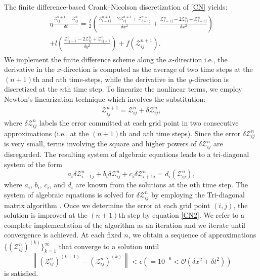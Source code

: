 \documentclass{article}
\begin{document}
The finite difference-based Crank--Nicolson discretization of \eqref{CN} yields:
\begin{eqnarray}
\begin{aligned}
\eta \frac{\mathcal{Z}^{n+1}_{ij}-\mathcal{Z}^n_{ij}}{\delta t}=\frac{l}{2}\left(\frac{\mathcal{Z}^{n+1}_{i-1j} - 2\mathcal{Z}^{n+1}_{ij} + \mathcal{Z}^{n+1}_{i+1j}}{\delta x^2} + \frac{\mathcal{Z}^{n}_{i-1j} - 2\mathcal{Z}^{n}_{ij} + \mathcal{Z}^{n}_{i+1j}}{\delta x^2}\right )\\
+l\left(\frac{\mathcal{Z}^{n}_{ij-1} - 2 \mathcal{Z}^{n}_{ij} + \mathcal{Z}^{n}_{ij+1}}{\delta y^2}\right)+f(\mathcal{Z}^{n+1}_{ij}).\label{CN1}
\end{aligned}
\end{eqnarray}
We implement the finite difference scheme along the $x$-direction i.e., the derivative in the $x$-direction is computed as the average of two time steps at the $\left(n+1\right)$th and $n$th time-steps, while the derivative in the $y$-direction is discretized at the $n$th time step. To linearize the nonlinear terms, we employ Newton's linearization technique which involves the substitution: 
\begin{eqnarray}
\mathcal{Z}^{n+1}_{ij}=\mathcal{Z}^n_{ij}+\delta \mathcal{Z}^n_{ij},\label{CN2}
\end{eqnarray}
where $\delta \mathcal{Z}^n_{ij}$ labels the error committed at each grid point in two consecutive approximations (i.e., at the $(n+1)$th and $n$th time steps). Since the error $\delta \mathcal{Z}^n_{ij}$ is very small, terms involving the square and higher powers of $\delta \mathcal{Z}^n_{ij}$ are disregarded. The resulting system of algebraic equations leads to a tri-diagonal system of the form
$$a_{i}\delta \mathcal{Z}^{n}_{i-1j}+b_{i}\delta \mathcal{Z}^{n}_{ij}+c_{i}\delta \mathcal{Z}^{n}_{i+1j}=d_{i}(\mathcal{Z}^n_{ij}),$$
where $a_{i}$, $b_{i}$, $c_{i}$, and $d_{i}$ are known from the solutions at the $n$th time step. The system of algebraic equations is solved for $\delta \mathcal{Z}_{ij}^n$ by employing the Tri-diagonal matrix algorithm \cite{Burden-Faires}. Once we determine the error at each grid point $\left(i, j\right)$, the solution is improved at the $\left(n+1\right)$th step by equation \eqref{CN2}. We refer to a complete implementation of the algorithm as an iteration 
and we iterate until convergence is achieved. 
 At each fixed $n$, we obtain a sequence of approximations $\{(\mathcal{Z}^{n}_{ij})^{(k)}\}_{k=1}^{\infty}$ that converge to a solution until $$\left\|\left(\mathcal{Z}^{n}_{ij}\right)^{(k+1)}-\left(\mathcal{Z}^{n}_{ij}\right)^{(k)}\right\|<\epsilon\left(=10^{-6}< \mathcal{O}\left(\delta x^2 + \delta t^2\right)\right)$$ is satisfied.
 
\end{document}
